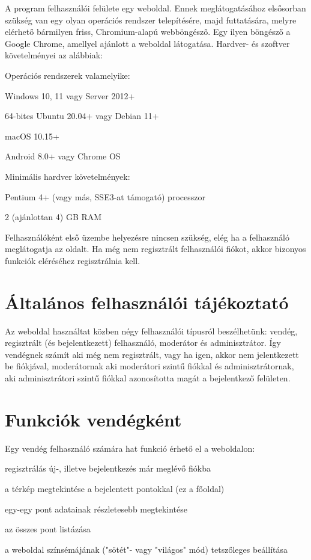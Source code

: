 A program felhasználói felülete egy weboldal. Ennek meglátogatásához elsősorban szükség van egy olyan operációs rendszer telepítésére, majd futtatására, melyre elérhető bármilyen friss, Chromium-alapú webböngésző. Egy ilyen böngésző a Google Chrome, amellyel ajánlott a weboldal látogatása. Hardver- és szoftver követelményei \cite{chrome-requirements} az alábbiak:
\begin{compactitem}
	\item Operációs rendszerek valamelyike:
	\begin{compactitem}
		\item Windows 10, 11 vagy Server 2012+
		\item 64-bites Ubuntu 20.04+ vagy Debian 11+
		\item macOS 10.15+
		\item Android 8.0+ vagy Chrome OS
	\end{compactitem}
	\item Minimális hardver követelmények:
	\begin{compactitem}
		\item Pentium 4+ (vagy más, SSE3-at támogató) processzor
		\item 2 (ajánlottan 4) GB RAM
	\end{compactitem}
\end{compactitem}

Felhasználóként első üzembe helyezésre nincsen szükség, elég ha a felhasználó meglátogatja az oldalt. Ha még nem regisztrált felhasználói fiókot, akkor bizonyos funkciók eléréséhez regisztrálnia kell.

\section{Általános felhasználói tájékoztató}

Az weboldal használtat közben négy felhasználói típusról beszélhetünk: vendég, regisztrált (és bejelentkezett) felhasználó, moderátor és adminisztrátor. Így vendégnek számít aki még nem regisztrált, vagy ha igen, akkor nem jelentkezett be fiókjával, moderátornak aki moderátori szintű fiókkal és adminisztrátornak, aki adminisztrátori szintű fiókkal azonosította magát a bejelentkező felületen.
\newpage

\section{Funkciók vendégként}

\noindent Egy vendég felhasználó számára hat funkció érhető el a weboldalon:
\begin{compactitem}
	\item regisztrálás új-, illetve bejelentkezés már meglévő fiókba
	\item a térkép megtekintése a bejelentett pontokkal (ez a főoldal)
	\item egy-egy pont adatainak részletesebb megtekintése
	\item az összes pont listázása
	\item a weboldal színsémájának ("sötét"- vagy "világos" mód) tetszőleges beállítása
\end{compactitem}


